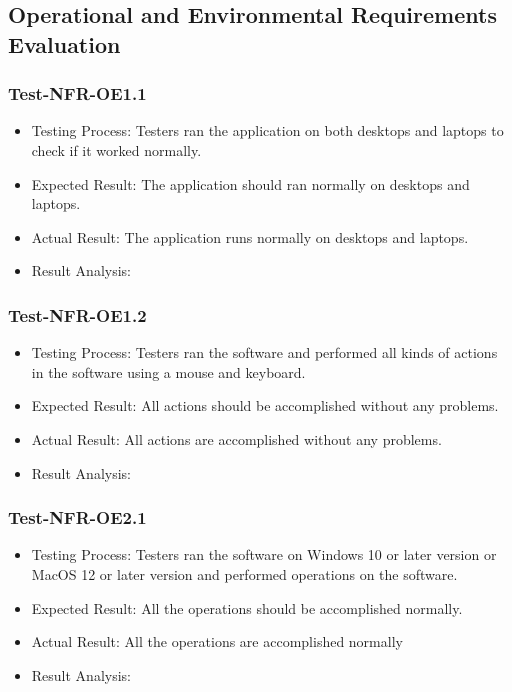\documentclass[12pt, titlepage]{article}
\begin{document}
\subsection{Operational and Environmental Requirements Evaluation}
\subsubsection{Test-NFR-OE1.1}
\begin{itemize}
    \item Testing Process: Testers ran the application on both desktops and laptops to check if it worked normally.
    \item Expected Result: The application should ran normally on desktops and laptops.
    \item Actual Result: The application runs normally on desktops and laptops.
    \item Result Analysis: \pass
\end{itemize}
\subsubsection{Test-NFR-OE1.2}
\begin{itemize}
    \item Testing Process: Testers ran the software and performed all kinds of actions in the software using a mouse and keyboard.
    \item Expected Result: All actions should be accomplished without any problems.
    \item Actual Result: All actions are accomplished without any problems.
    \item Result Analysis: \pass
\end{itemize}
\subsubsection{Test-NFR-OE2.1}
\begin{itemize}
    \item Testing Process: Testers ran the software on Windows 10 or later version or MacOS 12 or later version and performed operations on the software.
    \item Expected Result: All the operations should be accomplished normally.
    \item Actual Result: All the operations are accomplished normally
    \item Result Analysis: \pass
\end{itemize}
\end{document}
